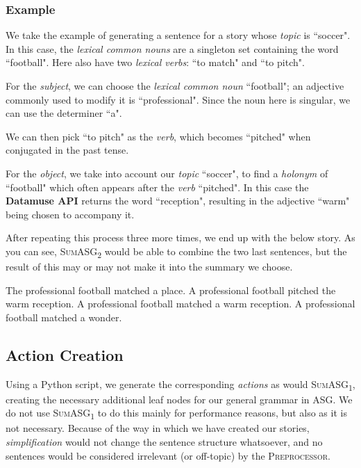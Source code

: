 \subsubsection{Example}

We take the example of generating a sentence for a story whose \textit{topic} is ``soccer". In this case, the \textit{lexical common nouns} are a singleton set containing the word ``football". Here also have two \textit{lexical verbs}: ``to match" and ``to pitch".

For the \textit{subject}, we can choose the \textit{lexical common noun} ``football"; an adjective commonly used to modify it is ``professional". Since the noun here is singular, we can use the determiner ``a".

We can then pick ``to pitch" as the \textit{verb}, which becomes ``pitched" when conjugated in the past tense.

For the \textit{object}, we take into account our \textit{topic} ``soccer", to find a \textit{holonym} of ``football" which often appears after the \textit{verb} ``pitched". In this case the \textbf{Datamuse API} returns the word ``reception", resulting in the adjective ``warm" being chosen to accompany it.

After repeating this process three more times, we end up with the below story. As you can see, \textsc{SumASG\textsubscript{2}} would be able to combine the two last sentences, but the result of this may or may not make it into the summary we choose.

\begin{displayquote}
The professional football matched a place. A professional football pitched the warm reception. A professional football matched a warm reception. A professional football matched a wonder.
\end{displayquote}

\subsection{Action Creation}

Using a Python script, we generate the corresponding \textit{actions} as would \textsc{SumASG\textsubscript{1}}, creating the necessary additional leaf nodes for our general grammar in ASG. We do not use \textsc{SumASG\textsubscript{1}} to do this mainly for performance reasons, but also as it is not necessary. Because of the way in which we have created our stories, \textit{simplification} would not change the sentence structure whatsoever, and no sentences would be considered irrelevant (or off-topic) by the \textsc{Preprocessor}.

